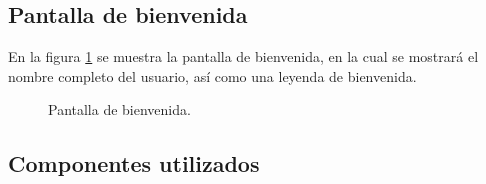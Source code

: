 		
		
			


\subsection{Pantalla de bienvenida}
\label{ch:Interaccion:PantallaBienvenida}

En la figura \ref{fig:inicio} se muestra la pantalla de bienvenida, en la cual se mostrará el nombre completo del usuario, así como una leyenda de bienvenida.
\begin{figure}[htbp!]
    \begin{center}
	\caption{Pantalla de bienvenida.}
	\label{fig:inicio}
    \end{center}
\end{figure}


\subsection{Componentes utilizados}

